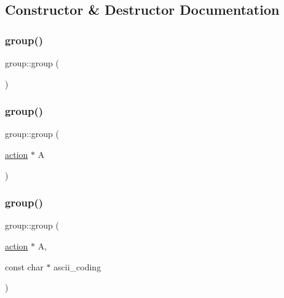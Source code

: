 \subsection{Constructor \& Destructor Documentation}
\mbox{\label{classgroup_ad9d5836aea085e5b55ecb077d15a6189}} 
\subsubsection{\texorpdfstring{group()}{group()}\hspace{0.1cm}{\footnotesize\ttfamily [1/4]}}
{\footnotesize\ttfamily group\+::group (\begin{DoxyParamCaption}{ }\end{DoxyParamCaption})}

\mbox{\label{classgroup_a84a8809f0d07b5ebcd1b8e6273bccc03}} 
\subsubsection{\texorpdfstring{group()}{group()}\hspace{0.1cm}{\footnotesize\ttfamily [2/4]}}
{\footnotesize\ttfamily group\+::group (\begin{DoxyParamCaption}\item[{\mbox{\hyperlink{classaction}{action}} $\ast$}]{A }\end{DoxyParamCaption})}

\mbox{\label{classgroup_a4b5532e8c8132fedadb68d4bbd0d4ca0}} 
\subsubsection{\texorpdfstring{group()}{group()}\hspace{0.1cm}{\footnotesize\ttfamily [3/4]}}
{\footnotesize\ttfamily group\+::group (\begin{DoxyParamCaption}\item[{\mbox{\hyperlink{classaction}{action}} $\ast$}]{A,  }\item[{const char $\ast$}]{ascii\+\_\+coding }\end{DoxyParamCaption})}

\mbox{\label{classgroup_aab93320d8baed6178663d341d58994b0}} 
